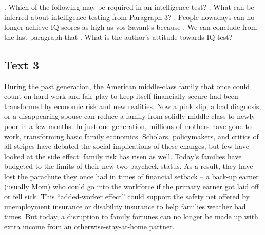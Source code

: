 \begin{questions}  .	Which of the following may be required in an intelligence test?
 .	What can be inferred about intelligence testing from Paragraph 3?
 .	People nowadays can no longer achieve IQ scores as high as vos Savant’s because
 .	We can conclude from the last paragraph that
 .	What is the author’s attitude towards IQ test?
\end{questions}    \subsection{Text 3}
During the past generation, the American middle-class family that once could count on hard work and fair play to keep itself financially secure had been transformed by economic risk and new realities. Now a pink slip, a bad diagnosis, or a disappearing spouse can reduce a family from solidly middle class to newly poor in a few months.
In just one generation, millions of mothers have gone to work, transforming basic family economics. Scholars, policymakers, and critics of all stripes have debated the social implications of these changes, but few have looked at the side effect: family risk has risen as well. Today’s families have budgeted to the limits of their new two-paycheck status. As a result, they have lost the parachute they once had in times of financial setback – a back-up earner (usually Mom) who could go into the workforce if the primary earner got laid off or fell sick. This “added-worker effect” could support the safety net offered by unemployment insurance or disability insurance to help families weather bad times. But today, a disruption to family fortunes can no longer be made up with extra income from an otherwise-stay-at-home partner.
